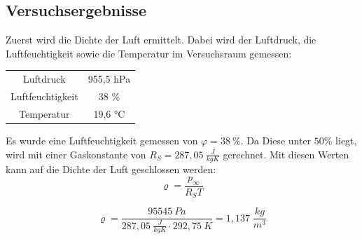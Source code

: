 \documentclass[pdfpaper,openbib, twoside, titlepage, halfparskip-,a4paper, 10pt]{scrarticle}
\begin{document}
\subsection{Versuchsergebnisse}
Zuerst wird die Dichte der Luft ermittelt. Dabei wird der Luftdruck, die Luftfeuchtigkeit sowie die Temperatur im Versuchsraum gemessen:
\begin{table}[H]
    \centering
\begin{tabular}{c|c}
    Luftdruck & 955,5 hPa\\
    Luftfeuchtigkeit & 38 \% \\
    Temperatur & 19,6 °C
\end{tabular}
\end{table}
Es wurde eine Luftfeuchtigkeit gemessen von $\varphi = 38 \ \%$. Da Diese unter $50 \%$ liegt, wird mit einer Gaskonstante von $R_S = 287,05 \ \frac{J}{kgK}$ gerechnet. 
Mit diesen Werten kann auf die Dichte der Luft geschlossen werden:
\begin{equation}
    \varrho = \frac{p_\infty}{R_S T}
\end{equation}

\begin{equation*}
    \varrho = \frac{95545 \ Pa}{287,05 \ \frac{J}{kgK} \cdot 292,75 \ K} = 1,137 \;\frac{kg}{m^3}
\end{equation*}
\end{document}
